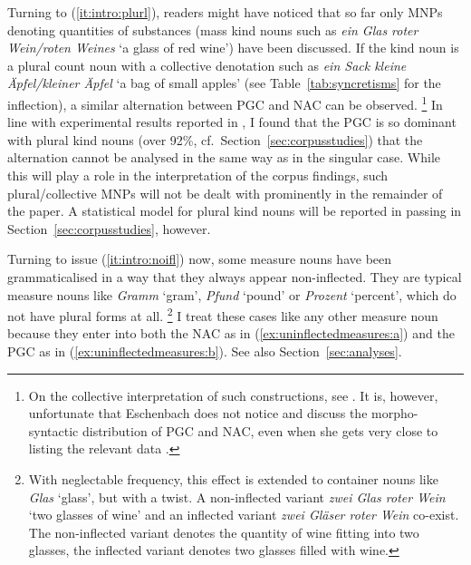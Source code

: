 \documentclass[USenglish]{article}
\begin{document}
Turning to (\ref{it:intro:plurl}), readers might have noticed that so far only MNPs denoting quantities of substances (mass kind nouns such as \textit{ein Glas roter Wein\slash roten Weines} `a glass of red wine') have been discussed.
If the kind noun is a plural count noun with a collective denotation such as \textit{ein Sack kleine Äpfel\slash kleiner Äpfel} `a bag of small apples' (see Table~\ref{tab:syncretisms} for the inflection), a similar alternation between PGC and NAC can be observed.%
\footnote{\label{fn:eschenbash}On the collective interpretation of such constructions, see \cite{Eschenbach1994}.
It is, however, unfortunate that Eschenbach does not notice and discuss the morpho-syntactic distribution of PGC and NAC, even when she gets very close to listing the relevant data \citep[217]{Eschenbach1994}.}
In line with experimental results reported in \citet[15--16]{Zimmer2015}, I found that the PGC is so dominant with plural kind nouns (over 92\%, cf.\ Section~\ref{sec:corpusstudies}) that the alternation cannot be analysed in the same way as in the singular case.
While this will play a role in the interpretation of the corpus findings, such plural\slash collective MNPs will not be dealt with prominently in the remainder of the paper.
A statistical model for plural kind nouns will be reported in passing in Section~\ref{sec:corpusstudies}, however.

Turning to issue (\ref{it:intro:noifl}) now, some measure nouns have been grammaticalised in a way that they always appear non-inflected.
They are typical measure nouns like \textit{Gramm} `gram', \textit{Pfund} `pound' or \textit{Prozent} `percent', which do not have plural forms at all.%
\footnote{With neglectable frequency, this effect is extended to container nouns like \textit{Glas} `glass', but with a twist.
A non-inflected variant \textit{zwei Glas roter Wein} `two glasses of wine' and an inflected variant \textit{zwei Gläser roter Wein} co-exist.
The non-inflected variant denotes the quantity of wine fitting into two glasses, the inflected variant denotes two glasses filled with wine.}
I treat these cases like any other measure noun because they enter into both the NAC as in (\ref{ex:uninflectedmeasures:a}) and the PGC as in (\ref{ex:uninflectedmeasures:b}).
See also Section~\ref{sec:analyses}.

\begin{exe}
  \ex\label{ex:uninflectedmeasures}
  \begin{xlist}
  \end{xlist}
\end{exe}
\end{document}
